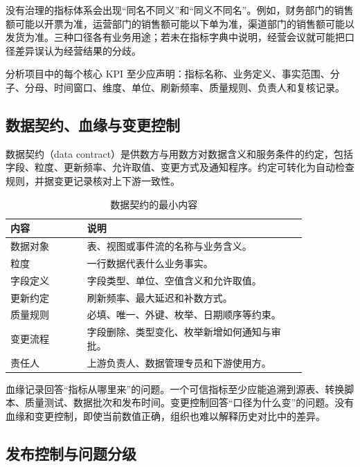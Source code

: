 没有治理的指标体系会出现“同名不同义”和“同义不同名”。例如，财务部门的销售额可能以开票为准，运营部门的销售额可能以下单为准，渠道部门的销售额可能以发货为准。三种口径各有业务用途；若未在指标字典中说明，经营会议就可能把口径差异误认为经营结果的分歧。

\begin{convention}[指标治理最小约定]
分析项目中的每个核心 KPI 至少应声明：指标名称、业务定义、事实范围、分子、分母、时间窗口、维度、单位、刷新频率、质量规则、负责人和复核记录。
\end{convention}

\subsection{数据契约、血缘与变更控制}

数据契约（data contract）是供数方与用数方对数据含义和服务条件的约定，包括字段、粒度、更新频率、允许取值、变更方式及通知程序。约定可转化为自动检查规则，并据变更记录核对上下游一致性。

\begin{table}[htbp]
\centering
\caption{数据契约的最小内容}
\begin{tabular}{P{0.22\linewidth}P{0.63\linewidth}}
\toprule
{}
内容 & 说明\\
\midrule

数据对象 & 表、视图或事件流的名称与业务含义。\\
粒度 & 一行数据代表什么业务事实。\\
字段定义 & 字段类型、单位、空值含义和允许取值。\\
更新约定 & 刷新频率、最大延迟和补数方式。\\
质量规则 & 必填、唯一、外键、枚举、日期顺序等约束。\\
变更流程 & 字段删除、类型变化、枚举新增如何通知与审批。\\
责任人 & 上游负责人、数据管理专员和下游使用方。\\
\bottomrule
\end{tabular}
\end{table}

血缘记录回答“指标从哪里来”的问题。一个可信指标至少应能追溯到源表、转换脚本、质量测试、数据批次和发布时间。变更控制回答“口径为什么变”的问题。没有血缘和变更控制，即使当前数值正确，组织也难以解释历史对比中的差异。

\subsection{发布控制与问题分级}

